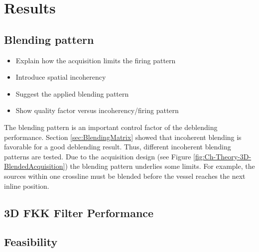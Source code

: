 \chapter{Results}

\section{Blending pattern}


\begin{itemize}
	\item Explain how the acquisition limits the firing pattern
	\item Introduce spatial incoherency
	\item Suggest the applied blending pattern
	\item Show quality factor versus incoherency/firing pattern
\end{itemize}

The blending pattern is an important control factor of the deblending performance. Section \ref{sec:BlendingMatrix} showed that incoherent blending is favorable for a good deblending result. Thus, different incoherent blending patterns are tested. Due to the acquisition design (see Figure \ref{fig:Ch-Theory-3D-BlendedAcquisition}) the blending pattern underlies some limits. For example, the sources within one crossline must be blended before the vessel reaches the next inline position. 


\section{3D FKK Filter Performance}

\section{Feasibility}








